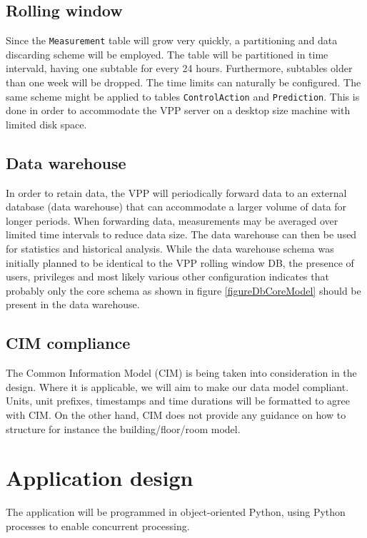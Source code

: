 \newpage


\subsection{Rolling window}\label{subsection:rollingwindow}
Since the \texttt{Measurement} table will grow very quickly, a partitioning and data discarding scheme will be employed. The table will be partitioned in time intervald, having one subtable for every 24 hours. Furthermore, subtables older than one week will be dropped. The time limits can naturally be configured. The same scheme might be applied to tables \texttt{ControlAction} and \texttt{Prediction}.
This is done in order to accommodate the VPP server on a desktop size machine with limited disk space.

\subsection{Data warehouse}
In order to retain data, the VPP will periodically forward data to an external database (data warehouse) that can accommodate a larger volume of data for longer periods. When forwarding data, measurements may be averaged over limited time intervals to reduce data size. The data warehouse can then be used for statistics and historical analysis. While the data warehouse schema was initially planned to be identical to the VPP rolling window DB, the presence of users, privileges and most likely various other configuration indicates that probably only the core schema as shown in figure \ref{figureDbCoreModel} should be present in the data warehouse. 

\subsection{CIM compliance}
The Common Information Model (CIM) is being taken into consideration in the design. Where it is applicable, we will aim to make our data model compliant. Units, unit prefixes, timestamps and time durations will be formatted to agree with CIM. On the other hand, CIM does not provide any guidance on how to structure for instance the building/floor/room model.

\newpage
\section{Application design}
The application will be programmed in object-oriented Python, using Python processes to enable concurrent processing. 

